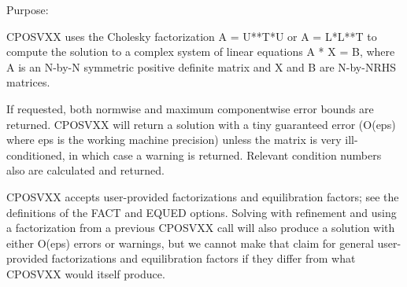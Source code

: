  \begin{DoxyParagraph}{Purpose\+: }
\begin{DoxyVerb}    CPOSVXX uses the Cholesky factorization A = U**T*U or A = L*L**T
    to compute the solution to a complex system of linear equations
    A * X = B, where A is an N-by-N symmetric positive definite matrix
    and X and B are N-by-NRHS matrices.

    If requested, both normwise and maximum componentwise error bounds
    are returned. CPOSVXX will return a solution with a tiny
    guaranteed error (O(eps) where eps is the working machine
    precision) unless the matrix is very ill-conditioned, in which
    case a warning is returned. Relevant condition numbers also are
    calculated and returned.

    CPOSVXX accepts user-provided factorizations and equilibration
    factors; see the definitions of the FACT and EQUED options.
    Solving with refinement and using a factorization from a previous
    CPOSVXX call will also produce a solution with either O(eps)
    errors or warnings, but we cannot make that claim for general
    user-provided factorizations and equilibration factors if they
    differ from what CPOSVXX would itself produce.\end{DoxyVerb}
 
\end{DoxyParagraph}
